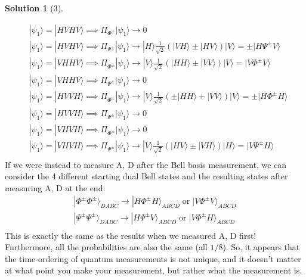 \documentclass[11pt]{article}
\theoremstyle{definition}
\newtheorem*{solution}{Solution}
\newcommand{\eq}{\begin{equation}\begin{aligned}}
\newcommand{\qe}{\end{aligned}\end{equation}}
\newcommand{\ket}[1]{|#1\rangle}
\begin{document}
\begin{solution}[3]
\begin{enumerate}[(a)]
    \eq
      &\ket{\psi_1}=\ket{HVHV}\implies \Pi_{\Phi^{\pm}}\ket{\psi_1}\to 0\\
      &\ket{\psi_1}=\ket{HVHV}\implies \Pi_{\Psi^{\pm}}\ket{\psi_1}\to \ket{H} \frac{1}{\sqrt{2}}(\ket{VH}\pm\ket{HV})\ket{V}=\pm \ket{H\Psi^{\pm}V}\\
      &\ket{\psi_1}=\ket{VHHV}\implies \Pi_{\Phi^{\pm}}\ket{\psi_1}\to \ket{V}\frac{1}{\sqrt{2}}(\ket{HH}\pm\ket{VV})\ket{V}=\ket{V\Phi^{\pm}V}\\
      &\ket{\psi_1}=\ket{VHHV}\implies \Pi_{\Psi^{\pm}}\ket{\psi_1}\to 0\\
      &\ket{\psi_1}=\ket{HVVH}\implies \Pi_{\Phi^{\pm}}\ket{\psi_1}\to \ket{V}\frac{1}{\sqrt{2}}(\pm\ket{HH}+\ket{VV})\ket{V}=\pm\ket{H\Phi^{\pm}H}\\
      &\ket{\psi_1}=\ket{HVVH}\implies \Pi_{\Psi^{\pm}}\ket{\psi_1}\to 0\\
      &\ket{\psi_1}=\ket{VHVH}\implies \Pi_{\Phi^{\pm}}\ket{\psi_1}\to 0\\
      &\ket{\psi_1}=\ket{VHVH}\implies \Pi_{\Psi^{\pm}}\ket{\psi_1}\to \ket{V} \frac{1}{\sqrt{2}}(\ket{HV}\pm\ket{VH})\ket{H}=\ket{V\Psi^{\pm}H}\\
    \qe
    If we were instead to measure A, D after the Bell basis measurement, we can consider the 4 different starting dual Bell states and the resulting states after measuring A, D at the end:
    \eq
      \ket{\Phi^{\pm}\Phi^{\pm}}_{DABC}\to \ket{H\Phi^{\pm}H}_{ABCD} \;\text{or}\;\ket{V\Phi^{\pm}V}_{ABCD}\\
      \ket{\Psi^{\pm}\Psi^{\pm}}_{DABC}\to \ket{H\Psi^{\pm}V}_{ABCD} \;\text{or}\;\ket{V\Phi^{\pm}H}_{ABCD}\\
    \qe
    This is exactly the same as the results when we measured A, D first! Furthermore, all the probabilities are also the same (all $1/8$). So, it appears that the time-ordering of quantum measurements is not unique, and it doesn't matter at what point you make your measurement, but rather what the measurement is.
  \end{enumerate}
\end{solution}
\end{document}
